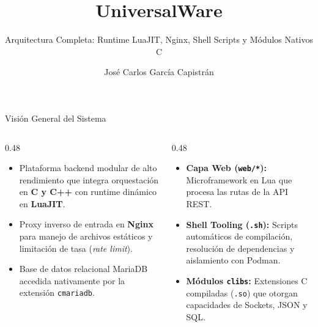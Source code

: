 \documentclass[10pt,aspectratio=169]{beamer}
\title{\textbf{UniversalWare}}
\subtitle{Arquitectura Completa: Runtime LuaJIT, Nginx, Shell Scripts y Módulos Nativos C}
\author{José Carlos García Capistrán}
\date{}
\begin{document}
{
\begin{frame}
    \titlepage
\end{frame}
}

\begin{frame}{Visión General del Sistema}
    \begin{columns}[T]
        \begin{column}{0.48\textwidth}
            \begin{itemize}
                \item Plataforma backend modular de alto rendimiento que integra orquestación en \textbf{C y C++} con runtime dinámico en \textbf{LuaJIT}.
                \item Proxy inverso de entrada en \textbf{Nginx} para manejo de archivos estáticos y limitación de tasa (\textit{rate limit}).
                \item Base de datos relacional MariaDB accedida nativamente por la extensión \texttt{cmariadb}.
            \end{itemize}
        \end{column}
        \begin{column}{0.48\textwidth}
            \begin{itemize}
                \item \textbf{Capa Web (\texttt{web/*}):} Microframework en Lua que procesa las rutas de la API REST.
                \item \textbf{Shell Tooling (\texttt{.sh}):} Scripts automáticos de compilación, resolución de dependencias y aislamiento con Podman.
                \item \textbf{Módulos \texttt{clibs}:} Extensiones C compiladas (\texttt{.so}) que otorgan capacidades de Sockets, JSON y SQL.
            \end{itemize}
        \end{column}
    \end{columns}
\end{frame}
\end{document}
